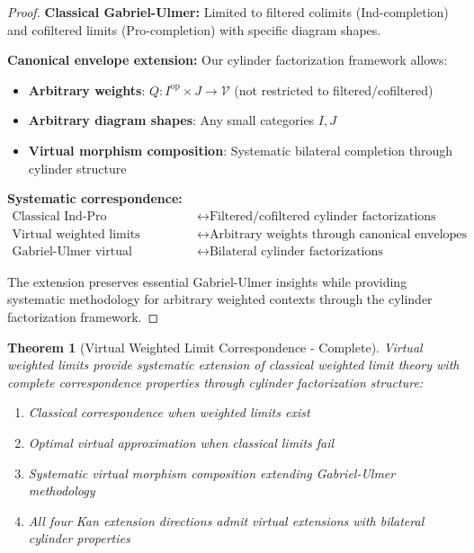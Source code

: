 \documentclass[11pt]{article}
\theoremstyle{plain}
\newtheorem{theorem}{Theorem}[section]
\theoremstyle{definition}
\theoremstyle{remark}
\newcommand{\V}{\mathcal{V}}
\newcommand{\op}{\mathrm{op}}
\begin{document}
\begin{proof}
\textbf{Classical Gabriel-Ulmer:} Limited to filtered colimits (Ind-completion) and cofiltered limits (Pro-completion) with specific diagram shapes.

\textbf{Canonical envelope extension:} Our cylinder factorization framework allows:
\begin{itemize}
\item \textbf{Arbitrary weights}: $Q : I^{\op} \times J \to \V$ (not restricted to filtered/cofiltered)
\item \textbf{Arbitrary diagram shapes}: Any small categories $I, J$
\item \textbf{Virtual morphism composition}: Systematic bilateral completion through cylinder structure
\end{itemize}

\textbf{Systematic correspondence:}
\begin{align}
\text{Classical Ind-Pro} &\longleftrightarrow \text{Filtered/cofiltered cylinder factorizations} \\
\text{Virtual weighted limits} &\longleftrightarrow \text{Arbitrary weights through canonical envelopes} \\
\text{Gabriel-Ulmer virtual morphisms} &\longleftrightarrow \text{Bilateral cylinder factorizations}
\end{align}

The extension preserves essential Gabriel-Ulmer insights while providing systematic methodology for arbitrary weighted contexts through the cylinder factorization framework.
\end{proof}

\begin{theorem}[Virtual Weighted Limit Correspondence - Complete]
Virtual weighted limits provide systematic extension of classical weighted limit theory with complete correspondence properties through cylinder factorization structure:

\begin{enumerate}
\item Classical correspondence when weighted limits exist
\item Optimal virtual approximation when classical limits fail
\item Systematic virtual morphism composition extending Gabriel-Ulmer methodology
\item All four Kan extension directions admit virtual extensions with bilateral cylinder properties
\end{enumerate}
\end{theorem}
\end{document}
